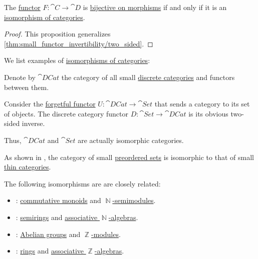 \begin{proposition}\label{thm:isomorphism_of_categories_iff_bijective_on_morphisms}
  The \hyperref[def:functor]{functor} \( F: \cat{C} \to \cat{D} \) is \hyperref[def:functor_invertibility/bijective]{bijective on morphisms} if and only if it is an \hyperref[def:isomorphism_of_categories]{isomorphism of categories}.
\end{proposition}
\begin{proof}
  This proposition generalizes \cref{thm:small_functor_invertibility/two_sided}.
\end{proof}

\begin{example}\label{ex:def:isomorphism_of_categories}
  We list examples of \hyperref[def:isomorphism_of_categories]{isomorphisms of categories}:
  \begin{thmenum}
     Denote by \( \cat{DCat} \) the category of all small \hyperref[def:discrete_category]{discrete categories} and functors between them.

    Consider the \hyperref[con:forgetful_functor]{forgetful functor} \( U: \cat{DCat} \to \cat{Set} \) that sends a category to its set of objects. The discrete category functor \( D: \cat{Set} \to \cat{DCat} \) is its obvious two-sided inverse.

    Thus, \( \cat{DCat} \) and \( \cat{Set} \) are actually isomorphic categories.

     As shown in , the category of small \hyperref[def:preordered_set]{preordered sets} is isomorphic to that of small \hyperref[def:thin_category]{thin categories}.

     The following isomorphisms are are closely related:
    \begin{itemize}
      \item {}: \hyperref[def:monoid]{commutative monoids} and \hyperref[def:semimodule]{\( \BbbN \)-semimodules}.

      \item {}: \hyperref[def:semiring]{semirings} and \hyperref[def:algebra_over_semiring]{associative \( \BbbN \)-algebras}.

      \item {}: \hyperref[def:abelian_group]{Abelian groups} and \hyperref[def:module]{\( \BbbZ \)-modules}.

      \item {}: \hyperref[def:ring]{rings} and \hyperref[def:algebra_over_semiring]{associative \( \BbbZ \)-algebras}.
    \end{itemize}
  \end{thmenum}
\end{example}

